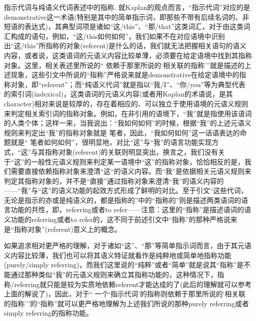 \documentclass{article}
\begin{document}
{{\heiti 指示代词与纯语义代词表述中的指称.}
就Kaplan的观点而言，“指示代词”对应的是demonstrative这一术语(特别是其中的简单指示词，即那些不带有后续名词的、非短语的表达式)，其典型词项是诸如“这/this”、“那/that”这类词汇，对于由这类词汇构成的语句，例如，“这/this如何如何”，我们如果不在对应语境中识别出“这/this”所指称的对象(referent)是什么的话，我们就无法把握相关语句的语义内容，或者说，这类语词的元语义内容比较单薄，必须要在给定语境中找到其指称对象。这里，相关表述里所说的“ 依赖于那里所说的‘相关联的指称’”就是描述的上述现象，这些引文中所说的“指称”严格说来就是demonstrative在给定语境中的指称对象，即“referent”；而“纯语义代词”就是指以“我/I”、“你/you”等为典型代表的索引词(indexical)，这类语词的元语义内容(或者用Kaplan的术语说，是其character)相对来说是较厚的，存在着相应的、可以独立于使用语境的元语义规则来判定相关索引词的指称对象。例如，在非引用的语境下，“我”就是指使用该语词的人类个体；这样一来，当我说出：“我如何如何”的时候，根据“我”的上述元语义规则来判定出“我”的指称对象就是
笔者，因此，“我如何如何”这一话语表达的命题就是“
笔者如何如何”，很明显地，对比“这”与“我”的语言功能实现方式，“这”与其指称对象(referent)的关联则明显突出，换言之，我们没有关于“这”的一般性元语义规则来判定某一语境中“这”的指称对象，恰恰相反的是，我们需要直接依赖指称对象来澄清“这“的语义内容。而“我”是依据相关元语义规则来判定其指称对象的，并不是“直接”通过指称对象来澄清“我”的语义内容的——“我”与“这”的语义功能的起效方式形成了鲜明的对比。至于引文“这些代词，无论是指示的亦或是纯语义的，都是指称的”中的“指称的”则是描述两类语词的语言功能的共性，即，referring或者to refer——注意：这里的“指称”是描述语词的语义功能的referring或者to refer的，这不同于前述引文中“指称”的那种严格说来是“指称对象”(referent)意义上的概念。

如果追求相对更严格的理解，对于诸如“这”、“那”等简单指示词而言，由于其元语义内容比较薄，我们也可以将其语义特证就看作是纯粹地或简单地指称功能(purely/simply referring)，而我们这里说的“纯粹”或者“简单”就是说其“指称”是不能通过那种类似“我”的元语义规则来确立其指称功能的，这种情况下，指称/referring就只能是较为实质地依赖referent才能达成的了(此后的理解就可以参考上面的解说了)，因此，对于“ 一个‘指示代词’的指称则依赖于那里所说的‘相关联的指称’”的“指称”就可以更严格地理解为上述我们所说的那种purely referring或者simply referring的指称功能。

}
\end{document}
